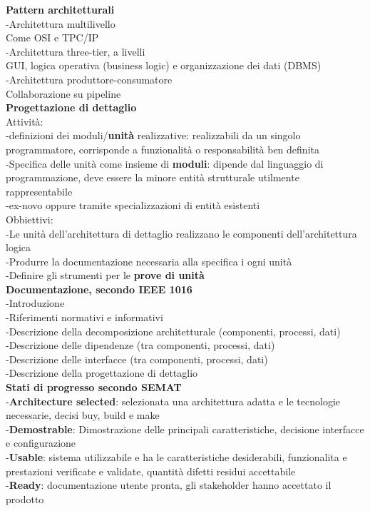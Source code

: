 \documentclass{article}
\begin{document}
		\textbf{Pattern architetturali}\\
		-Architettura multilivello\\
		Come OSI e TPC/IP\\
		-Architettura three-tier, a livelli\\
		GUI, logica operativa (business logic) e organizzazione dei dati (DBMS)\\
		-Architettura produttore-consumatore\\
		Collaborazione su pipeline\\
		
		\textbf{Progettazione di dettaglio}\\
		Attività:\\
		-definizioni dei moduli/\textbf{unità} realizzative: realizzabili da un singolo programmatore, corrisponde a funzionalità o responsabilità ben definita\\
		-Specifica delle unità come insieme di \textbf{moduli}: dipende dal linguaggio di programmazione, deve essere la minore entità strutturale utilmente rappresentabile\\
		-ex-novo oppure tramite specializzazioni di entità esistenti\\
		Obbiettivi:\\
		-Le unità dell'architettura di dettaglio realizzano le componenti dell'architettura logica\\
		-Produrre la documentazione necessaria alla specifica i ogni unità\\
		-Definire gli strumenti per le \textbf{prove di unità}\\
		
		\textbf{Documentazione, secondo IEEE 1016}\\
		-Introduzione\\
		-Riferimenti normativi e informativi\\
		-Descrizione della decomposizione architetturale (componenti, processi, dati)\\
		-Descrizione delle dipendenze (tra componenti, processi, dati)\\
		-Descrizione delle interfacce (tra componenti, processi, dati)\\
		-Descrizione della progettazione di dettaglio\\
		
		\textbf{Stati di progresso secondo SEMAT}\\
		-\textbf{Architecture selected}: selezionata una architettura adatta e le tecnologie necessarie, decisi buy, build e make\\
		-\textbf{Demostrable}: Dimostrazione delle principali caratteristiche, decisione interfacce e configurazione\\
		-\textbf{Usable}: sistema utilizzabile e ha le caratteristiche desiderabili, funzionalita e prestazioni verificate e validate, quantità difetti residui accettabile\\
		-\textbf{Ready}: documentazione utente pronta, gli stakeholder hanno accettato il prodotto
		
\end{document}
